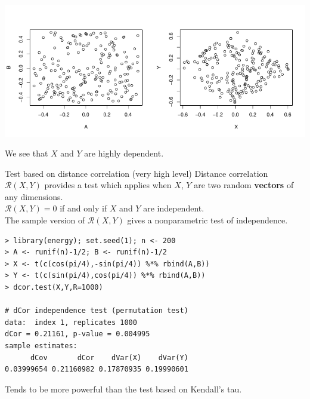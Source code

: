 \documentclass[11pt,handout,aspectratio=169,dvipsnames]{beamer}
\begin{document}
\begin{frame}{}
\begin{center}
	\includegraphics[width=0.5\textwidth]{pics/ABplot}\includegraphics[width=0.5\textwidth]{pics/XYplot}	
\end{center}
	We see that $X$ and $Y$ are highly dependent. 
\end{frame}

\begin{frame}[fragile,label=zerocor]{Test based on distance correlation (very high level)}
\alert{Distance correlation} $\mathcal R(X,Y)$ provides a test which applies when 
$X$, $Y$ are two random \textbf{vectors} of any dimensions.\\[.2cm]
$\mathcal R(X,Y)=0$ if and only if $X$ and $Y$ are independent.\\[.2cm]
The sample version of $\mathcal R(X,Y)$ gives a \alert{nonparametric} test of independence. \\[.2cm]
\begin{lstlisting}
> library(energy); set.seed(1); n <- 200
> A <- runif(n)-1/2; B <- runif(n)-1/2
> X <- t(c(cos(pi/4),-sin(pi/4)) %*% rbind(A,B))
> Y <- t(c(sin(pi/4),cos(pi/4)) %*% rbind(A,B))
> dcor.test(X,Y,R=1000)

# dCor independence test (permutation test)
data:  index 1, replicates 1000
dCor = 0.21161, p-value = 0.004995
sample estimates:
      dCov       dCor    dVar(X)    dVar(Y) 
0.03999654 0.21160982 0.17870935 0.19990601 
\end{lstlisting}
Tends to be more powerful than the test based on Kendall's tau.
\end{frame}
\end{document}
